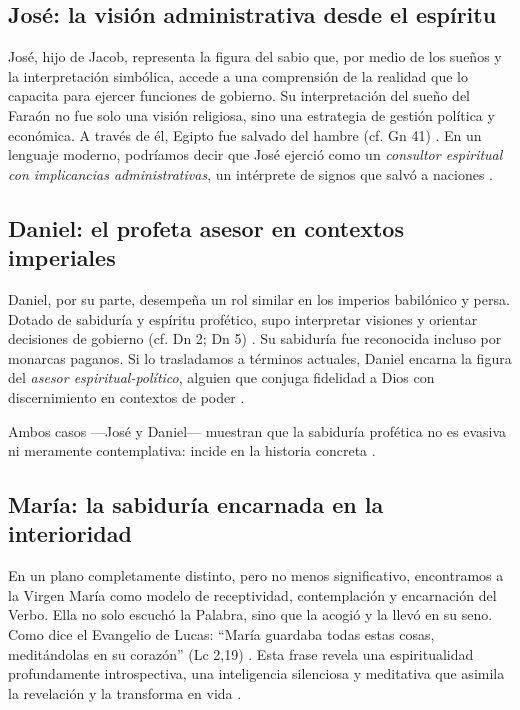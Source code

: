 \documentclass[a4paper,12pt]{article}
\begin{document}
\subsection*{José: la visión administrativa desde el espíritu}

José, hijo de Jacob, representa la figura del sabio que, por medio de los sueños y la interpretación simbólica, accede a una comprensión de la realidad que lo capacita para ejercer funciones de gobierno. Su interpretación del sueño del Faraón no fue solo una visión religiosa, sino una estrategia de gestión política y económica. A través de él, Egipto fue salvado del hambre (cf. Gn 41) \cite{Biblia}. En un lenguaje moderno, podríamos decir que José ejerció como un \textit{consultor espiritual con implicancias administrativas}, un intérprete de signos que salvó a naciones \cite{jung1959,jung1971}.

\subsection*{Daniel: el profeta asesor en contextos imperiales}

Daniel, por su parte, desempeña un rol similar en los imperios babilónico y persa. Dotado de sabiduría y espíritu profético, supo interpretar visiones y orientar decisiones de gobierno (cf. Dn 2; Dn 5) \cite{Biblia}. Su sabiduría fue reconocida incluso por monarcas paganos. Si lo trasladamos a términos actuales, Daniel encarna la figura del \textit{asesor espiritual-político}, alguien que conjuga fidelidad a Dios con discernimiento en contextos de poder \cite{jung1959}.

Ambos casos —José y Daniel— muestran que la sabiduría profética no es evasiva ni meramente contemplativa: incide en la historia concreta \cite{jung1959,jung1971}.

\subsection*{María: la sabiduría encarnada en la interioridad}

En un plano completamente distinto, pero no menos significativo, encontramos a la Virgen María como modelo de receptividad, contemplación y encarnación del Verbo. Ella no solo escuchó la Palabra, sino que la acogió y la llevó en su seno. Como dice el Evangelio de Lucas: ``María guardaba todas estas cosas, meditándolas en su corazón'' (Lc 2,19) \cite{Biblia}. Esta frase revela una espiritualidad profundamente introspectiva, una inteligencia silenciosa y meditativa que asimila la revelación y la transforma en vida \cite{jung1959,jung1964}.
\end{document}
